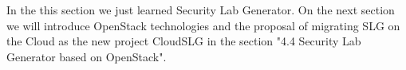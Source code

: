   
In the this section we just learned Security Lab Generator. On the next section we will introduce OpenStack technologies and the proposal of migrating SLG on the Cloud as the new project CloudSLG in the section "4.4 Security Lab Generator based on OpenStack". 


 






% 